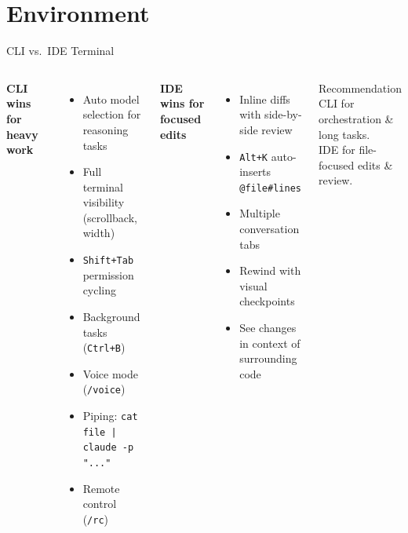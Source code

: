 \documentclass[aspectratio=169]{beamer}
\begin{document}
\section{Environment}

\begin{frame}{CLI vs.\ IDE Terminal}
\begin{columns}[T]
\textbf{\color{popblue}CLI wins for heavy work}
\begin{itemize}
  \item Auto model selection for reasoning tasks
  \item Full terminal visibility (scrollback, width)
  \item \texttt{Shift+Tab} permission cycling
  \item Background tasks (\texttt{Ctrl+B})
  \item Voice mode (\texttt{/voice})
  \item Piping: \texttt{cat file | claude -p "..."}
  \item Remote control (\texttt{/rc})
\end{itemize}

\textbf{\color{paramgreen}IDE wins for focused edits}
\begin{itemize}
  \item Inline diffs with side-by-side review
  \item \texttt{Alt+K} auto-inserts \texttt{@file\#lines}
  \item Multiple conversation tabs
  \item Rewind with visual checkpoints
  \item See changes in context of surrounding code
\end{itemize}

\bigskip
\begin{exampleblock}{Recommendation}
CLI for orchestration \& long tasks. \\
IDE for file-focused edits \& review.
\end{exampleblock}
\end{columns}
\end{frame}
\end{document}
